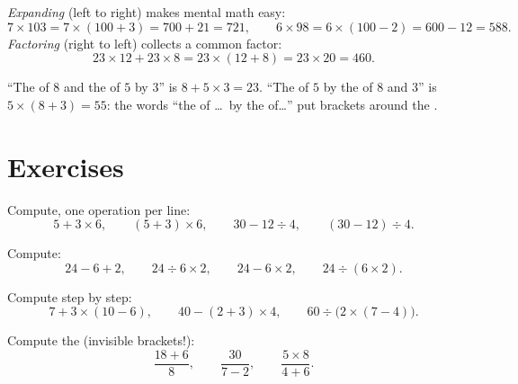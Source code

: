 \begin{example}\label{ex:g7:priorities:distributivity}
\emph{Expanding} (left to right) makes mental math easy:
\[
7 \times 103 = 7 \times (100 + 3) = 700 + 21 = 721,
\qquad
6 \times 98 = 6 \times (100 - 2) = 600 - 12 = 588 .
\]
\emph{Factoring} (right to left) collects a common factor:
\[
23 \times 12 + 23 \times 8 = 23 \times (12 + 8) = 23 \times 20 = 460 .
\]
\end{example}

\begin{example}\label{ex:g7:priorities:words}
``The  of $8$ and the  of $5$ by $3$'' is $8 + 5 \times 3 =
23$. ``The  of $5$ by the  of $8$ and $3$'' is
$5 \times (8 + 3) = 55$: the words ``the  of \dots\ by the 
of\dots'' put brackets around the .
\end{example}

\section{Exercises}

\begin{exercise}[$\star$]\label{exo:g7:priorities:1}
Compute, one operation per line:
\[
5 + 3 \times 6, \qquad
(5 + 3) \times 6, \qquad
30 - 12 \div 4, \qquad
(30 - 12) \div 4 .
\]
\end{exercise}

\begin{exercise}[$\star$]\label{exo:g7:priorities:2}
Compute:
\[
24 - 6 + 2, \qquad
24 \div 6 \times 2, \qquad
24 - 6 \times 2, \qquad
24 \div (6 \times 2).
\]
\end{exercise}

\begin{exercise}[$\star$]\label{exo:g7:priorities:3}
Compute step by step:
\[
7 + 3 \times (10 - 6), \qquad
40 - (2 + 3) \times 4, \qquad
60 \div \bigl(2 \times (7 - 4)\bigr).
\]
\end{exercise}

\begin{exercise}[$\star$]\label{exo:g7:priorities:4}
Compute the  (invisible brackets!):
\[
\frac{18 + 6}{8}, \qquad
\frac{30}{7 - 2}, \qquad
\frac{5 \times 8}{4 + 6} .
\]
\end{exercise}

